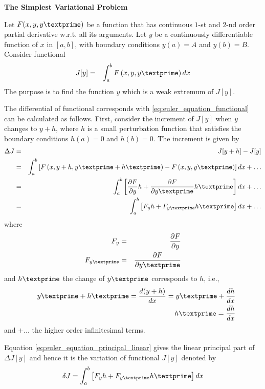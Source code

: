 \begin{mdframed}
\noindent \textbf{The Simplest Variational Problem}

Let $F(x,y,y\textprime)$ be a function that has continuous $1$-st and $2$-nd order partial derivative w.r.t. all its arguments. Let $y$ be a continuously differentiable function of $x$ in $[a,b]$, with boundary conditions $y(a)=A$ and $y(b)=B$. Consider functional
\begin{eqnarray}
	J[y] &=& \int_{a}^{b} F\left(x, y, y\textprime\right)dx \label{eq:euler_equation_functional}
\end{eqnarray}
The purpose is to find the function $y$ which is a weak extremum of $J[y]$.

\end{mdframed}

The differential of functional corresponds with \eqref{eq:euler_equation_functional} can be calculated as follows. First, consider the increment of $J[y]$ when $y$ changes to $y+h$, where $h$ is a small perturbation function that satisfies the boundary conditions $h(a)=0$ and $h(b)=0$. The increment is given by
\begin{eqnarray}
	\Delta J &=& J[y+h] - J[y] \nonumber \\
	&=& \int_{a}^{b} \left[F\left(x, y+h, y\textprime + h\textprime\right) - F\left(x, y, y\textprime\right)\right]dx + \ldots \nonumber \\
	&=& \int_{a}^{b} \left[\dfrac{\partial F}{\partial y}h + \dfrac{\partial F}{\partial y\textprime}  h \textprime \right]dx + \ldots \nonumber \\ 
	&=& \int_{a}^{b} \left[F_yh + F_{y\textprime}h \textprime \right]dx + \ldots \label{eq:euler_equation_principal_linear}
\end{eqnarray}
where 
\begin{eqnarray}
	F_y &=& \dfrac{\partial F}{\partial y} \nonumber \\
	F_{y\textprime} &=& \dfrac{\partial F}{\partial y\textprime} \nonumber
\end{eqnarray}
and $h\textprime$ the change of $y\textprime$ corresponds to $h$, i.e.,
\begin{eqnarray}
	&& y\textprime + h\textprime = \dfrac{d(y+h)}{dx} = y\textprime + \dfrac{dh}{dx} \nonumber \\
	&& h\textprime = \dfrac{dh}{dx} \nonumber
\end{eqnarray}
and $+ \ldots$ the higher order infinitesimal terms.

Equation \eqref{eq:euler_equation_principal_linear} gives the linear principal part of $\Delta J[y]$ and hence it is the variation of functional $J[y]$ denoted by
\begin{eqnarray}
\delta J = \int_{a}^{b} \left[F_yh + F_{y\textprime} h \textprime \right]dx \label{eq:euler_equation_variation}
\end{eqnarray}

